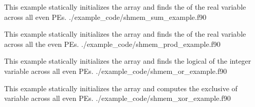 \begin{apidefinition}
\begin{apiexamples}
\apifexample
    {This \Fortran example statically initializes the  array and finds
    the  of the real variable  across all even \acp{PE}.}
    {./example_code/shmem_sum_example.f90}
    {}

\apifexample
    {This \Fortran example statically initializes the  array and finds
    the  of the real variable  across all the even \acp{PE}.}
    {./example_code/shmem_prod_example.f90}
    {}

\apifexample
    {This \Fortran example statically initializes the  array and finds
    the logical  of the integer variable  across all even
    \acp{PE}.}
    {./example_code/shmem_or_example.f90}
    {}

\apifexample
    {This \Fortran example statically initializes the  array and
    computes the exclusive  of variable  across all even
    \acp{PE}.}
    {./example_code/shmem_xor_example.f90}
    {}

\end{apiexamples}

\end{apidefinition}
